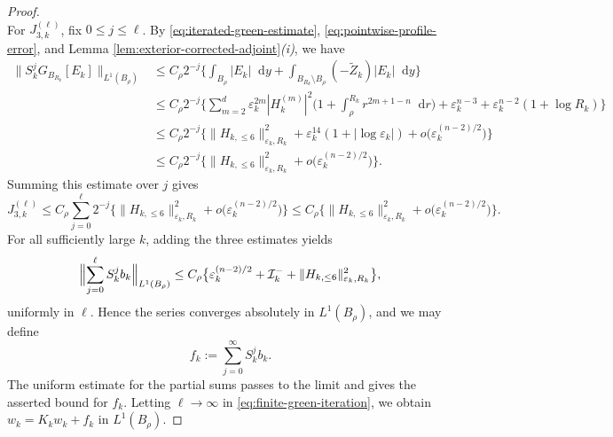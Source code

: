 \documentclass[10pt,a4paper]{amsart}
\newcommand{\dd}{\mathop{}\!\mathrm{d}}
\theoremstyle{plain}
\theoremstyle{remark}
\begin{document}
\begin{proof}
{\[\]
}
 For $J_{3,k}^{(\ell)}$, fix $0\le j\le\ell$.  By
\eqref{eq:iterated-green-estimate},
\eqref{eq:pointwise-profile-error}, and
Lemma  \ref{lem:exterior-corrected-adjoint}\emph{(i)}, we have
{
\[
\begin{aligned}
 \Big\|S_k^jG_{B_{R_k}}[E_k]
 \Big\|_{L^1(B_\rho)}
 &\le C_\rho 2^{-j}
 \Big\{
 \int_{B_\rho}|E_k|\dd y
 +\int_{B_{R_k}\setminus B_\rho}(-\widetilde Z_k)|E_k|\dd y
 \Big\}\\
 &\le C_\rho 2^{-j}
 \Big\{
 \sum_{m=2}^d\varepsilon_k^{2m}|H_k^{(m)}|^2
 \bigg(1+\int_\rho^{R_k}r^{2m+1-n}\dd r\bigg)
 +\varepsilon_k^{n-3}
 +\varepsilon_k^{n-2}(1+\log R_k)
 \Big\}\\
 &\le C_\rho 2^{-j}\big\{
 \|H_{k,\le6}\|_{\varepsilon_k,R_k}^2
 +\varepsilon_k^{14}(1+|\log\varepsilon_k|)
 +o\bigl(\varepsilon_k^{(n-2)/2}\bigr)\big\}\\
 &\le C_\rho 2^{-j}\big\{
 \|H_{k,\le6}\|_{\varepsilon_k,R_k}^2
 +o\bigl(\varepsilon_k^{(n-2)/2}\bigr)\big\}.
\end{aligned}
\]
}
 Summing this estimate over $j$ gives
{
\[
 J_{3,k}^{(\ell)}
 \le C_\rho\sum_{j=0}^{\ell}2^{-j}
 \big\{\|H_{k,\le6}\|_{\varepsilon_k,R_k}^2
 +o\bigl(\varepsilon_k^{(n-2)/2}\bigr)\big\}
 \le C_\rho\big\{\|H_{k,\le6}\|_{\varepsilon_k,R_k}^2
 +o\bigl(\varepsilon_k^{(n-2)/2}\bigr)\big\}.
\]
}
For all sufficiently large $k$, adding the three estimates yields
{
\[
 \Bigl\|\sum_{j=0}^{\ell}S_k^jb_k\Bigr\|_{L^1(B_\rho)}
 \le C_\rho\big\{\varepsilon_k^{(n-2)/2}+\mathcal I_k^-
 +\|H_{k,\le6}\|_{\varepsilon_k,R_k}^2\big\},
\]
}
uniformly in $\ell$.  Hence the series converges absolutely in
$L^1(B_\rho)$, and we may define
{
\[
 f_k:=\sum_{j=0}^{\infty}S_k^jb_k.
\]
}
{The uniform estimate for the partial sums passes to the limit and gives the asserted
bound for \(f_k\).  Letting \(\ell\to\infty\) in
\eqref{eq:finite-green-iteration}, we obtain}
 $w_k=K_kw_k+f_k$ in $L^1(B_\rho)$.
\end{proof}
\end{document}
